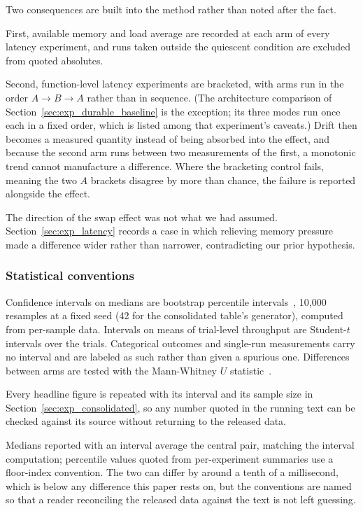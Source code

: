 \documentclass[preprint,12pt]{elsarticle}
\begin{document}
Two consequences are built into the method rather than noted after the fact.

First, available memory and load average are recorded at each arm of every
latency experiment, and runs taken outside the quiescent condition are excluded
from quoted absolutes.

Second, function-level latency experiments are bracketed, with arms run in
the order $A \rightarrow B \rightarrow A$ rather than in sequence. (The
architecture comparison of Section~\ref{sec:exp_durable_baseline} is the
exception; its three modes run once each in a fixed order, which is listed
among that experiment's caveats.) Drift then becomes a
measured quantity instead of being absorbed into the effect, and because the
second arm runs between two measurements of the first, a monotonic trend cannot
manufacture a difference. Where the bracketing control fails, meaning the two
$A$ brackets disagree by more than chance, the failure is reported alongside
the effect.

The direction of the swap effect was not what we had assumed.
Section~\ref{sec:exp_latency} records a case in which relieving memory
pressure made a difference wider rather than narrower, contradicting our prior
hypothesis.

\subsubsection*{Statistical conventions}

Confidence intervals on medians are bootstrap percentile
intervals~\cite{efron1993bootstrap}, 10{,}000 resamples at a fixed seed
(42 for the consolidated table's generator), computed from per-sample data. Intervals on means of
trial-level throughput are Student-$t$ intervals over the trials. Categorical
outcomes and single-run measurements carry no interval and are labeled as such
rather than given a spurious one. Differences between arms are tested with the
Mann-Whitney $U$ statistic~\cite{mannwhitney1947}.

Every headline figure is repeated with its interval and its sample size in
Section~\ref{sec:exp_consolidated}, so any number quoted in the running text can
be checked against its source without returning to the released data.

Medians reported with an interval average the central pair, matching the
interval computation; percentile values quoted from per-experiment summaries use
a floor-index convention. The two can differ by around a tenth of a millisecond,
which is below any difference this paper rests on, but the conventions are named
so that a reader reconciling the released data against the text is not left
guessing.
\end{document}
